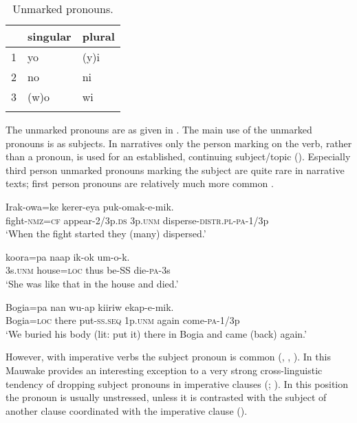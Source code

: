 \begin{table}[h]
 \caption{Unmarked pronouns.}
\label{tab:3:unmarkedpronouns}

\begin{tabular}{lll}
\mytoprule
 &singular &plural\\
\midrule
1 &yo &(y)i\\
2 &no &ni\\
3 &(w)o &wi\\
\mybottomrule
\end{tabular}
\end{table}

The unmarked pronouns are as given in .
The main use of the unmarked pronouns is as subjects. In narratives only the person marking on the verb, rather than a pronoun, is used for an established, continuing subject/topic (). Especially third person unmarked pronouns marking the subject are quite rare in narrative texts; first person pronouns are relatively much more common \citep[79--80]{Jarvinen1991}. 

\ea 
\gll Irak-owa=ke kerer-eya   puk-omak-e-mik.\\
fight-\textsc{nmz}=\textsc{cf} appear-2/3p.\textsc{ds} 3p.\textsc{unm} disperse-\textsc{distr}.\textsc{pl}-\textsc{pa}-1/3p\\
\glt`When the fight started they (many) dispersed.'
\z

\ea%
\label{ex:x534}
\gll {} koora=pa naap ik-ok um-o-k. \\
3s.\textsc{unm} house=\textsc{loc} thus be-SS die-\textsc{pa}-3s\\
\glt`She was like that in the house and died.'
\z

\ea%
\label{ex:x1803}
\gll Bogia=pa nan wu-ap  kiiriw ekap-e-mik. \\
Bogia=\textsc{loc} there put-\textsc{ss}.\textsc{seq} 1p.\textsc{unm} again come-\textsc{pa}-1/3p\\
\glt`We buried his body (lit: put it) there in Bogia and came (back) again.'
\z

However, with imperative verbs the subject pronoun is common (, , ). In this Mauwake provides an interesting exception to a very strong cross-linguistic tendency of dropping subject pronouns in imperative clauses (\citealt[80]{Givon1979}; \citealt[173--174]{SadockEtAl1985}). In this position the pronoun is usually unstressed, unless it is contrasted with the subject of another clause coordinated with the imperative clause (). 

